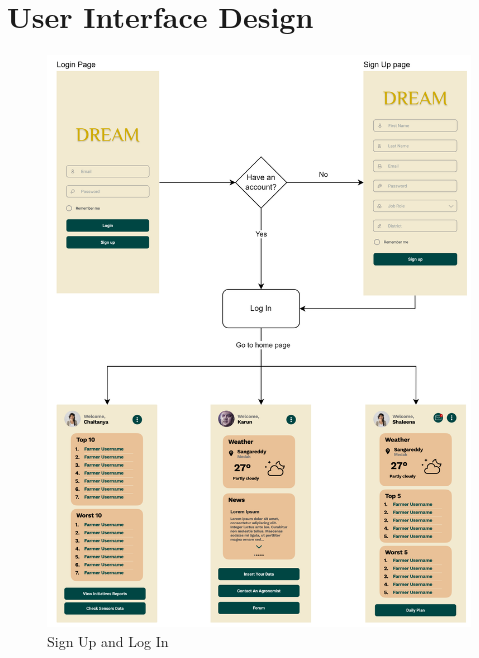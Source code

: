 \documentclass[table, 12pt]{article}
\begin{document}
\newpage
\section{User Interface Design}
\begin{center}
    \begin{figure}[H]
        \includegraphics[scale=0.74, center]{assets/MockUp/SignUpandLogin.png}
        \caption{Sign Up and Log In}
        \label{fig: signMockup}
    \end{figure}
\end{center}
\end{document}

